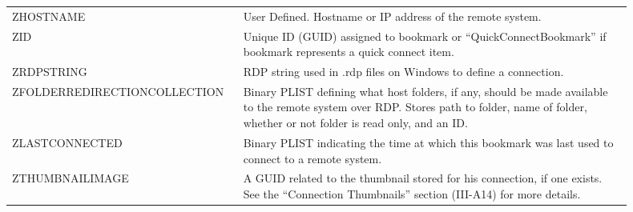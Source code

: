 \documentclass[journal]{IEEEtran}
\begin{document}
\begin{table}[h!]
\begin{tabular}{p{0.3\linewidth} | p{0.6\linewidth}}
ZHOSTNAME                     & User Defined. Hostname or IP address of the remote system.                                                                                                                                                                                           \\
ZID                           & Unique ID (GUID) assigned to bookmark or “QuickConnectBookmark” if bookmark represents a quick connect item.                                                                                   \\
ZRDPSTRING                    & RDP string used in .rdp files on Windows to define a connection.                                                                                                                               \\
ZFOLDERREDIRECTIONCOLLECTION  & Binary PLIST defining what host folders, if any, should be made available to the remote system over RDP. Stores path to folder, name of folder, whether or not folder is read only, and an ID. \\
ZLASTCONNECTED                & Binary PLIST indicating the time at which this bookmark was last used to connect to a remote system.                                                                                           \\
ZTHUMBNAILIMAGE               & A GUID related to the thumbnail stored for his connection, if one exists. See the “Connection Thumbnails” section (III-A14) for more details.                                                                                                                                                                                         
\end{tabular}
\end{table}


\clearpage

\begin{flushleft}

\end{flushleft}
\end{document}
